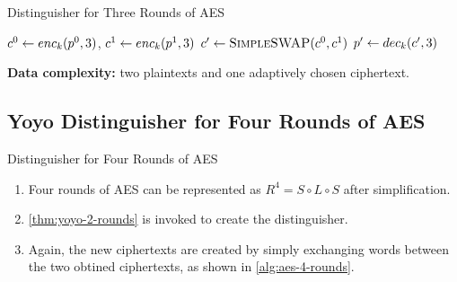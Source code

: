 \documentclass[notheorems]{beamer}
\theoremstyle{definition}
\theoremstyle{example}
\begin{document}
    \begin{frame}{Distinguisher for Three Rounds of AES}
        \begin{algorithm}[H]
            \caption{Distinguisher for Three Rounds of AES}
            \label{alg:aes-3-rounds}
            \begin{algorithmic}[1]
                \State \(c^0 \gets enc_k(p^0, 3)\), \(c^1 \gets enc_k(p^1,
                3)\)
                \State \(c^\prime \gets \textsc{SimpleSWAP}(c^0, c^1)\)
                \State \(p^\prime \gets dec_k(c^\prime, 3)\)
                    \State {}
                \Else
                    \State {}
                \EndIf
            \end{algorithmic}
        \end{algorithm}
        \textbf{Data complexity:} two plaintexts and one adaptively chosen
        ciphertext.
    \end{frame}

    \subsection{Yoyo Distinguisher for Four Rounds of AES}
    \label{subsec:aes-4-rounds}

    \begin{frame}[<+->]{Distinguisher for Four Rounds of AES}
    \begin{enumerate}
        \item Four rounds of AES can be represented as \(R^4 = S \circ L \circ
        S\) after simplification. 
        \item \cref{thm:yoyo-2-rounds} is invoked to create the distinguisher.
        \item Again, the new ciphertexts are created by simply exchanging words
        between the two obtined ciphertexts, as shown in
        \cref{alg:aes-4-rounds}.
    \end{enumerate}
    \end{frame}
\end{document}
